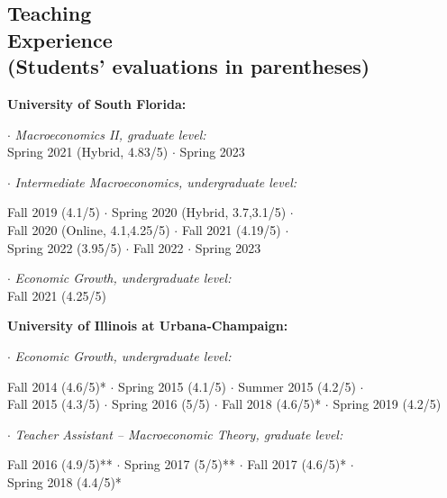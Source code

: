 \documentclass[mm, 10pt]{simple_style}
\begin{document}
\begin{resume}

\section{Teaching\\ Experience \\ {\protect\footnotesize (Students' evaluations in parentheses)}}

\textbf{University of South Florida:}

$\cdot$ \textit{Macroeconomics II, graduate level:} \\
\indent \hspace{1cm} Spring 2021 (Hybrid, 4.83/5) $\cdot$ Spring 2023

$\cdot$  \textit{Intermediate Macroeconomics, undergraduate level:}\\
\indent \hspace{1cm}  \begin{minipage}[t]{0.75\textwidth}
Fall 2019 (4.1/5) $\cdot$ Spring 2020 (Hybrid, 3.7,3.1/5) $\cdot$ \\
Fall 2020 (Online, 4.1,4.25/5) $\cdot$ Fall 2021 (4.19/5) $\cdot$ \\
Spring 2022 (3.95/5) $\cdot$ Fall 2022 $\cdot$ Spring 2023
\end{minipage}

$\cdot$  \textit{Economic Growth, undergraduate level:} \\
\indent \hspace{1cm}  Fall 2021 (4.25/5) 

\textbf{University of Illinois at Urbana-Champaign:}

$\cdot$ \textit{Economic Growth, undergraduate level:} \\
\indent \hspace{1cm}  \begin{minipage}[t]{0.8\textwidth}
Fall 2014 (4.6/5)* $\cdot$ Spring 2015 (4.1/5) $\cdot$ Summer 2015 (4.2/5) $\cdot$ \\
Fall 2015 (4.3/5) $\cdot$ Spring 2016 (5/5) $\cdot$ Fall 2018 (4.6/5)* $\cdot$ Spring 2019 (4.2/5)
\end{minipage}

$\cdot$ \textit{Teacher Assistant -- Macroeconomic Theory, graduate level:} \\
\indent \hspace{1cm}  \begin{minipage}[t]{0.75\textwidth}
Fall 2016 (4.9/5)** $\cdot$ Spring 2017 (5/5)** $\cdot$ Fall 2017 (4.6/5)* $\cdot$ \\
Spring 2018 (4.4/5)*
\end{minipage}


\end{resume}
\end{document}
